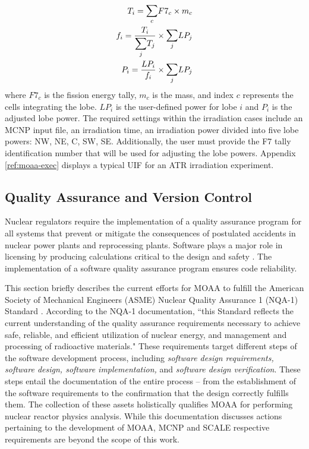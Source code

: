 \begin{align}
T_i = \mathlarger{\sum}_c F7_{c} \times m_c \\
f_i = \frac{T_i}{ \mathlarger{\sum}_j T_j } \times \mathlarger{\sum}_j LP_j \\
P_i = \frac{LP_i}{f_i} \times \mathlarger{\sum}_j LP_j
\end{align}
where $F7_{c}$ is the fission energy tally, $m_c$ is the mass, and index $c$ represents the cells integrating the lobe.
$LP_i$ is the user-defined power for lobe $i$ and $P_i$ is the adjusted lobe power.
The required settings within the irradiation cases include an MCNP input file, an irradiation time, an irradiation power divided into five lobe powers: NW, NE, C, SW, SE.
Additionally, the user must provide the F7 tally identification number that will be used for adjusting the lobe powers.
Appendix \ref{ref:moaa-exec} displays a typical UIF for an ATR irradiation experiment.


\subsection{Quality Assurance and Version Control}
\label{sec:quality}

Nuclear regulators require the implementation of a quality assurance program for all systems that prevent or mitigate the consequences of postulated accidents in nuclear power plants and reprocessing plants.
Software plays a major role in licensing by producing calculations critical to the design and safety \cite{sqa}.
The implementation of a software quality assurance program ensures code reliability.

This section briefly describes the current efforts for MOAA to fulfill the American Society of Mechanical Engineers (ASME) Nuclear Quality Assurance 1 (NQA-1) Standard \cite{nqa1}.
According to the NQA-1 documentation, ``this Standard reflects the current understanding of the quality assurance requirements necessary to achieve safe, reliable, and efficient utilization of nuclear energy, and management and processing of radioactive materials."
These requirements target different steps of the software development process, including \textit{software design requirements, software design, software implementation,} and \textit{software design verification}.
These steps entail the documentation of the entire process -- from the establishment of the software requirements to the confirmation that the design correctly fulfills them.
% 
The collection of these assets holistically qualifies MOAA for performing nuclear reactor physics analysis.
While this documentation discusses actions pertaining to the development of MOAA, MCNP and SCALE respective requirements are beyond the scope of this work.

